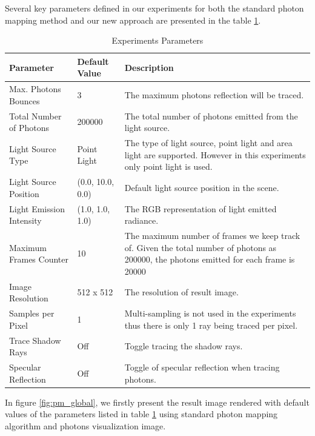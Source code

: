 Several key parameters defined in our experiments for both the standard photon mapping method and our new approach are presented in the table \ref{tab:expr_params}.

\begin{table}[t]
\caption{Experiments Parameters}
\centering
	\renewcommand{\arraystretch}{1.2}
	\begin{tabular}{p{5cm} p{3cm} p{5cm}}
	{\bf Parameter}  				& 		{\bf Default Value} 		&		{\bf Description} \\
	\hline
	Max. Photons Bounces	& 		3					&		The maximum photons reflection will be traced. \\
	\hline 					
	Total Number of Photons 	& 		200000				&		The total number of photons emitted from the light 																	source. \\
	\hline
	Light Source Type			& 		Point Light			& 		The type of light source, point light and area light
																are supported. However in this experiments only point 																	light is used. \\
	\hline
	Light Source Position 		& 	 	(0.0, 10.0, 0.0)		&		Default light source position in the scene. \\
	\hline
	Light Emission Intensity	&		(1.0, 1.0, 1.0)		&		The RGB representation of light emitted radiance.\\
	\hline
	Maximum Frames Counter 	& 		10 					& 		The maximum number of frames we keep track of. Given 																	the total number of photons as 200000, the photons 																	 emitted for each frame is 20000\\
	\hline
	Image Resolution 			&		512 x 512				&		The resolution of result image. \\
	\hline
	Samples per Pixel			& 		1 					& 		Multi-sampling is not used in the experiments thus 																	there is only 1 ray being traced per pixel.\\
	\hline
	Trace Shadow Rays			&		Off					& 		Toggle tracing the shadow rays. \\
	\hline
	Specular Reflection		&		Off					&		Toggle of specular reflection when tracing photons. \\
	\hline
	\end{tabular}
\label{tab:expr_params}
\end{table}

In figure \ref{fig:pm_global}, we firstly present the result image rendered with default values of the parameters listed in table \ref{tab:expr_params} using standard photon mapping algorithm and photons visualization image.

